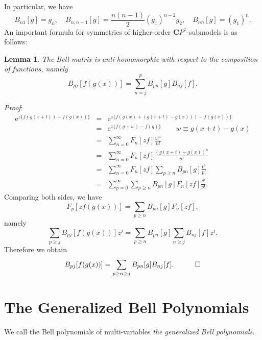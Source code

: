 \documentclass[makeidx,12pt,openany]{report}
\newtheorem{lem}[df]{Lemma}
\begin{document}
\noindent
In particular,  we have
\begin{equation}
B_{n1}[g]=g_n, \quad B_{n,n-1}[g]=\frac{n(n-1)}{2}(g_1)^{n-2}g_2, \quad
B_{nn}[g]=(g_1)^n.
\end{equation}
An important formula for symmetries of higher-order $\mathbf{C}P^1$-submodels 
is as follows:
\begin{lem}\label{lem:antihomo}
The Bell matrix is anti-homomorphic  
with respect to the composition of functions, namely
\begin{equation}
 B_{pj}[f(g(x))]=\sum_{n=j}^p B_{pn}[g]B_{nj}[f]. 
 \label{eqn:Bmat}
\end{equation}
\end{lem}
\textit{Proof}: 
\begin{eqnarray*}
 \mbox{e}^{z\{ f(g(x+t))-f(g(x)) \} }
 &=& \mbox{e}^{z\{ f(g(x)+(g(x+t)-g(x)))-f(g(x)) \} } \\
 &=& \mbox{e}^{z\{ f(g+w)-f(g) \} } \qquad w \equiv g(x+t)-g(x) \\
 &=& \sum_{n=0}^{\infty}F_n[zf]\frac{w^n}{{n!}} \\
 &=& \sum_{n=0}^{\infty}F_n[zf]\frac{(g(x+t)-g(x))^n}{{n!}} \\
 &=& \sum_{n=0}^{\infty}F_n[zf]\sum_{p \ge n}B_{pn}[g]\frac{t^p}{{p!}} \\
 &=& \sum_{p=0}^{\infty}\sum_{p \ge n}B_{pn}[g]F_n[zf]\frac{t^p}{{p!}}.  
\end{eqnarray*}
Comparing both sides, we have
\begin{equation*}
F_p[zf(g(x))]=\sum_{p \ge n}B_{pn}[g]F_n[zf], 
\end{equation*}
namely
\begin{equation*}
\sum_{p \ge j}B_{pj}[f(g(x))]z^j
  =\sum_{p \ge n}B_{pn}[g]\sum_{n \ge j}B_{nj}[f]z^j. 
\end{equation*}
Therefore we obtain 
\begin{equation*}
 B_{pj}[f(g(x))]=\sum_{p \ge n \ge j}B_{pn}[g]B_{nj}[f]. \quad \qed
\end{equation*} 
\section{The Generalized Bell Polynomials}\label{section:genBell}
We call the Bell polynomials of multi-variables 
{\it{the generalized Bell polynomials}}\cite{DF}. 
\end{document}
